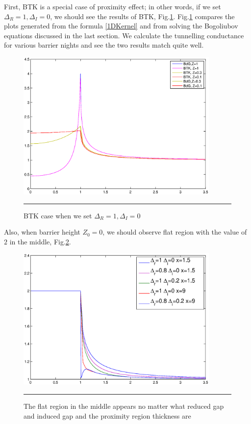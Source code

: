 First, BTK is a special case of proximity effect; in other words, if we set $\Delta_R=1,\Delta_I=0$, we should see the results of BTK, Fig.\ref{fig:BTK reproduction}. Fig.\ref{fig:BTK reproduction} compares the plots generated from the formula \eqref{1DKernel} and from solving the Bogoliubov equations discussed in the last section. We calculate the tunnelling conductance for various barrier nights and see the two results match quite well. 
\begin{figure}[htbp]
\small
	\centering
		\includegraphics[width=10cm]{./Figures/3-2-8.eps}
		\rule{35em}{0.5pt}
	\caption[An Electron]{BTK case when we set $\Delta_R=1,\Delta_I=0$}
	\label{fig:BTK reproduction}
\end{figure}

Also, when barrier height $Z_0=0$, we should observe flat region with the value of $2$ in the middle, Fig.\ref{fig:z reproduction}.
\begin{figure}[htbp]
\small
	\centering
		\includegraphics[width=10cm]{./Figures/3-2-9.eps}
		\rule{35em}{0.5pt}
	\caption[An Electron]{The flat region in the middle appears no matter what reduced gap and induced gap and the proximity region thickness are}
	\label{fig:z reproduction}
\end{figure}

